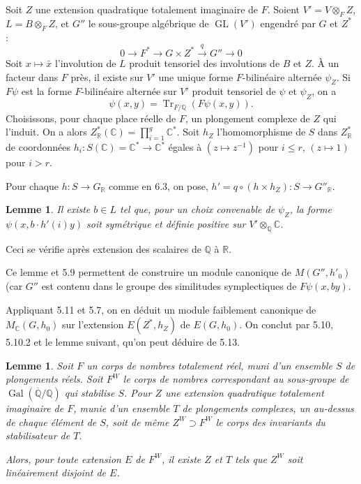 \documentclass[11pt]{amsart}
\theoremstyle{plain}
\newtheorem{lemma}[theorem]{Lemme}
\theoremstyle{definition}
\DeclareMathOperator{\Gal}{Gal}
\DeclareMathOperator{\GL}{GL}
\DeclareMathOperator{\Tr}{Tr}
\newcommand{\QQ}{\mathbb{Q}}
\newcommand{\RR}{\mathbb{R}}
\newcommand{\CC}{\mathbb{C}}
\newcommand{\MC}{M_{\mathbb{C}}}
\begin{document}
Soit $Z$ une extension quadratique totalement imaginaire de $F$. Soient $V' = V \otimes_F Z$, $L = B \otimes_F Z$, et $G''$ le sous-groupe alg\'ebrique de $\GL(V')$ engendr\'e par $G$ et $Z^*$ :
\begin{equation}\label{eq:6.4.1}
0 \longrightarrow F^* \longrightarrow G \times Z^* \xrightarrow{\;q\;} G'' \longrightarrow 0
\end{equation}
Soit $x \mapsto \bar{x}$ l'involution de $L$ produit tensoriel des involutions de $B$ et $Z$. \`A un facteur dans $F$ pr\`es, il existe sur $V'$ une unique forme $F$-bilin\'eaire altern\'ee $\psi_Z$. Si $F\psi$ est la forme $F$-bilin\'eaire altern\'ee sur $V'$ produit tensoriel de $\psi$ et $\psi_Z$, on a
\[
\psi(x,y) = \Tr_{F/\QQ}(F\psi(x,y)).
\]
Choisissons, pour chaque place r\'eelle de $F$, un plongement complexe de $Z$ qui l'induit. On a alors $Z^*_{\RR}(\CC) = \prod_{i=1}^g \CC^*$. Soit $h_Z$ l'homomorphisme de $S$ dans $Z^*_{\RR}$ de coordonn\'ees $h_i : S(\CC) = \CC^* \to \CC^*$ \'egales \`a $(z \mapsto z^{-1})$ pour $i \leq r$, $(z \mapsto 1)$ pour $i > r$.

Pour chaque $h : S \to G_{\RR}$ comme en 6.3, on pose, $h' = q \circ (h \times h_Z) : S \to G''_{\RR}$.

\begin{lemma}
Il existe $b \in L$ tel que, pour un choix convenable de $\psi_Z$, la forme $\psi(x, b \cdot h'(i)y)$ soit sym\'etrique et d\'efinie positive sur $V' \otimes_{\QQ} \CC$.
\end{lemma}

Ceci se v\'erifie apr\`es extension des scalaires de $\QQ$ \`a $\RR$.

Ce lemme et 5.9 permettent de construire un module canonique de $M(G'', h'_0)$ (car $G''$ est contenu dans le groupe des similitudes symplectiques de $F\psi(x, by)$.

Appliquant 5.11 et 5.7, on en d\'eduit un module faiblement canonique de $\MC(G,h_0)$ sur l'extension $E(Z^*, h_Z)$ de $E(G,h_0)$. On conclut par 5.10, 5.10.2 et le lemme suivant, qu'on peut d\'eduire de 5.13.

\begin{lemma}
Soit $F$ un corps de nombres totalement r\'eel, muni d'un ensemble $S$ de plongements r\'eels. Soit $F^W$ le corps de nombres correspondant au sous-groupe de $\Gal(\overline{\QQ}/\QQ)$ qui stabilise $S$. Pour $Z$ une extension quadratique totalement imaginaire de $F$, munie d'un ensemble $T$ de plongements complexes, un au-dessus de chaque \'el\'ement de $S$, soit de m\^eme $Z^W \supset F^W$ le corps des invariants du stabilisateur de $T$.

Alors, pour toute extension $E$ de $F^W$, il existe $Z$ et $T$ tels que $Z^W$ soit lin\'eairement disjoint de $E$.
\end{lemma}
\end{document}
